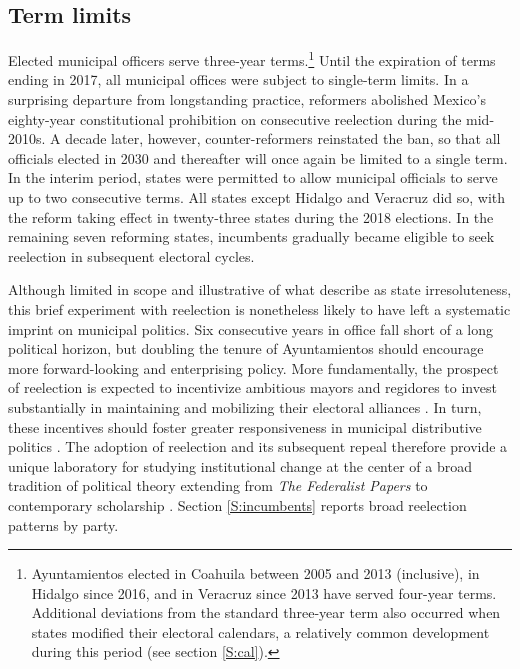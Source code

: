 \documentclass[letter,12pt]{article}
\begin{document}
\subsection{Term limits}
Elected municipal officers serve three-year terms.\footnote{Ayuntamientos elected in Coahuila between 2005 and 2013 (inclusive), in Hidalgo since 2016, and in Veracruz since 2013 have served four-year terms. Additional deviations from the standard three-year term also occurred when states modified their electoral calendars, a relatively common development during this period (see section \ref{S:cal}).} Until the expiration of terms ending in 2017, all municipal offices were subject to single-term limits. In a surprising departure from longstanding practice, reformers abolished Mexico's eighty-year constitutional prohibition on consecutive reelection during the mid-2010s. A decade later, however, counter-reformers reinstated the ban, so that all officials elected in 2030 and thereafter will once again be limited to a single term. In the interim period, states were permitted to allow municipal officials to serve up to two consecutive terms. All states except Hidalgo and Veracruz did so, with the reform taking effect in twenty-three states during the 2018 elections. In the remaining seven reforming states, incumbents gradually became eligible to seek reelection in subsequent electoral cycles.

Although limited in scope and illustrative of what \citet{cox.mccubbins.2001} describe as state irresoluteness, this brief experiment with reelection is nonetheless likely to have left a systematic imprint on municipal politics. Six consecutive years in office fall short of a long political horizon, but doubling the tenure of Ayuntamientos should encourage more forward-looking and enterprising policy. More fundamentally, the prospect of reelection is expected to incentivize ambitious mayors and regidores to invest substantially in maintaining and mobilizing their electoral alliances \citep{cain.etal.1987, motolinia-reel-pork2021}. In turn, these incentives should foster greater responsiveness in municipal distributive politics \citep{cox.mccubbins.1986, jacobson.kernell.1983}. The adoption of reelection and its subsequent repeal therefore provide a unique laboratory for studying institutional change at the center of a broad tradition of political theory extending from \emph{The Federalist Papers} to contemporary scholarship \citep{madison.etal.1788, mayhew.1974, schlesinger.1966, miller.hammond.1989}. Section \ref{S:incumbents} reports broad reelection patterns by party.
\end{document}
